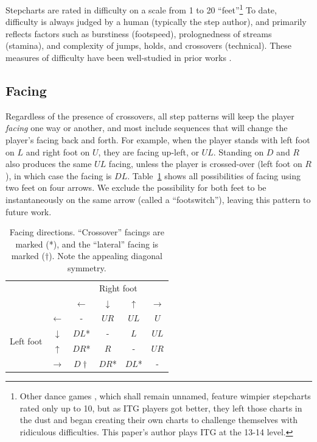 \documentclass[10pt]{sigplanconf}
\begin{document}
Stepcharts are rated in difficulty on a scale from 1 to 20 ``feet''\footnote{
Other dance games \cite{konami}, which shall remain unnamed, feature wimpier stepcharts rated only up to 10, but as ITG players got better, they left those charts in the dust and began creating their own charts to challenge themselves with ridiculous difficulties. This paper's author plays ITG at the 13-14 level.}
To date, difficulty is always judged by a human (typically the step author), and primarily reflects factors such as burstiness (footspeed), prolognedness of streams (stamina), and complexity of jumps, holds, and crossovers (technical).
These measures of difficulty have been well-studied in prior works \cite{callofthehound,dawgsinthehouse}.

\subsection{Facing}

Regardless of the presence of crossovers, all step patterns will keep the player {\em facing} one way or another, and most include sequences that will change the player's facing back and forth.
For example, when the player stands with left foot on $L$ and right foot on $U$, they are facing up-left, or $UL$. Standing on $D$ and $R$ also produces the same $UL$ facing, unless the player is crossed-over (left foot on $R$), in which case the facing is $DL$.
Table~\ref{tab:facing} shows all possibilities of facing using two feet on four arrows.
We exclude the possibility for both feet to be instantaneously on the same arrow (called a ``footswitch''), leaving this pattern to future work.

\begin{table}[h]
	\begin{center}
	\begin{tabular}{cc|cccc}
		& & \multicolumn{4}{c}{Right foot} \\
		& & $\leftarrow$ & $\downarrow$ & $\uparrow$ & $\rightarrow$ \\
		\hline
		\multirow{4}{*}{Left foot}
		& $\leftarrow$  & - & $UR$ & $UL$ & $U$ \\
		& $\downarrow$  & $DL$* & - & $L$ & $UL$ \\
		& $\uparrow$    & $DR$* & $R$ & - & $UR$ \\
		& $\rightarrow$ & $D\dagger$ & $DR$* & $DL$* & - \\

	\end{tabular}
	\end{center}
	\caption{Facing directions. ``Crossover'' facings are marked (*), and the ``lateral'' facing is marked ($\dagger$). Note the appealing diagonal symmetry.}
	\label{tab:facing}
\end{table}
\end{document}
